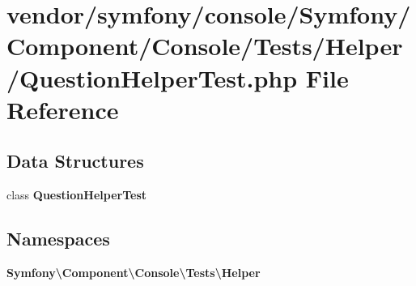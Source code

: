 \section{vendor/symfony/console/\+Symfony/\+Component/\+Console/\+Tests/\+Helper/\+Question\+Helper\+Test.php File Reference}
\label{_question_helper_test_8php}
\subsection*{Data Structures}
\begin{DoxyCompactItemize}
\item 
class {\bf Question\+Helper\+Test}
\end{DoxyCompactItemize}
\subsection*{Namespaces}
\begin{DoxyCompactItemize}
\item 
 {\bf Symfony\textbackslash{}\+Component\textbackslash{}\+Console\textbackslash{}\+Tests\textbackslash{}\+Helper}
\end{DoxyCompactItemize}
